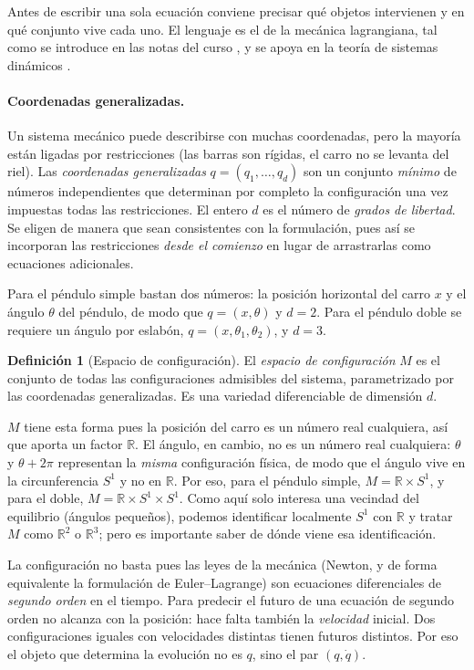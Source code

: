 \documentclass[11pt,letterpaper]{article}
\theoremstyle{definition}
\newtheorem{definicion}{Definición}[section]
\theoremstyle{plain}
\theoremstyle{remark}
\newcommand{\R}{\mathbb{R}}
\begin{document}
Antes de escribir una sola ecuación conviene precisar qué objetos
intervienen y en qué conjunto vive cada uno. El lenguaje es el de la
mecánica lagrangiana, tal como se introduce en las notas del curso
\cite{notas2026}, y se apoya en la teoría de sistemas dinámicos
\cite{hirsch2004}.

\paragraph{Coordenadas generalizadas.} Un sistema mecánico puede
describirse con muchas coordenadas, pero la mayoría están ligadas por
restricciones (las barras son rígidas, el carro no se levanta del riel).
Las \emph{coordenadas generalizadas} $q=(q_1,\dots,q_d)$ son un conjunto
\emph{mínimo} de números independientes que determinan por completo la
configuración una vez impuestas todas las restricciones. El entero $d$ es
el número de \emph{grados de libertad}. Se eligen de manera que sean consistentes con la formulación, pues así se incorporan las restricciones \emph{desde el
comienzo} en lugar de arrastrarlas como ecuaciones adicionales.

Para el péndulo simple bastan dos números: la posición horizontal del
carro $x$ y el ángulo $\theta$ del péndulo, de modo que $q=(x,\theta)$ y
$d=2$. Para el péndulo doble se requiere un ángulo por eslabón,
$q=(x,\theta_1,\theta_2)$, y $d=3$.

\begin{definicion}[Espacio de configuración]
\label{def:config}
El \emph{espacio de configuración} $M$ es el conjunto de todas las
configuraciones admisibles del sistema, parametrizado por las coordenadas
generalizadas. Es una variedad diferenciable de dimensión $d$.
\end{definicion}

$M$ tiene esta forma pues la posición del carro es un número
real cualquiera, así que aporta un factor $\R$. El ángulo, en cambio, no es un número real cualquiera: $\theta$ y $\theta+2\pi$ representan la
\emph{misma} configuración física, de modo que el ángulo vive en la
circunferencia $S^1$ y no en $\R$. Por eso, para el péndulo simple,
$M=\R\times S^1$, y para el doble, $M=\R\times S^1\times S^1$. Como aquí
solo interesa una vecindad del equilibrio (ángulos pequeños), podemos
identificar localmente $S^1$ con $\R$ y tratar $M$ como $\R^2$ o $\R^3$;
pero es importante saber de dónde viene esa identificación.

La configuración no basta pues las leyes de la mecánica
(Newton, y de forma equivalente la formulación de Euler--Lagrange) son ecuaciones
diferenciales de \emph{segundo orden} en el tiempo. Para predecir el
futuro de una ecuación de segundo orden no alcanza con la posición: hace
falta también la \emph{velocidad} inicial. Dos configuraciones iguales
con velocidades distintas tienen futuros distintos. Por eso el objeto que
determina la evolución no es $q$, sino el par $(q,\dot q)$.
\end{document}
